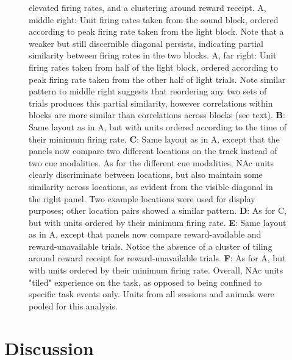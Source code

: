 \documentclass[11pt]{article}
\newcommand{\bsf}[1]{\textbf{#1}}
\begin{document}
{\begin{figure}[h]
{  elevated firing rates, and a clustering around reward receipt. A, middle
  right: Unit firing rates taken from the sound block, ordered according to peak
  firing rate taken from the light block. Note that a weaker but still
  discernible diagonal persists, indicating partial similarity between firing
  rates in the two blocks. A, far right: Unit firing rates taken from half of
  the light block, ordered according to peak firing rate taken from the other
  half of light trials. Note similar pattern to middle right suggests that
  reordering any two sets of trials produces this partial similarity, however
  correlations within blocks are more similar than correlations across blocks
  (see text). \bsf{B}: Same layout as in A, but with units ordered according to
  the time of their minimum firing rate. \bsf{C}: Same layout as in A, except
  that the panels now compare two different locations on the track instead of
  two cue modalities. As for the different cue modalities, NAc units clearly
  discriminate between locations, but also maintain some similarity across
  locations, as evident from the visible diagonal in the right panel. Two
  example locations were used for display purposes; other location pairs showed
  a similar pattern. \bsf{D}: As for C, but with units ordered by their minimum
  firing rate. \bsf{E}: Same layout as in A, except that panels now compare
  reward-available and reward-unavailable trials. Notice the absence of a
  cluster of tiling around reward receipt for reward-unavailable
  trials. \bsf{F}: As for A, but with units ordered by their minimum firing
  rate. Overall, NAc units "tiled" experience on the task, as opposed to being
  confined to specific task events only. Units from all sessions and animals
  were pooled for this analysis.}
\label{fig:NP_tiling}
\end{figure}

\section*{Discussion}

}
\end{document}
